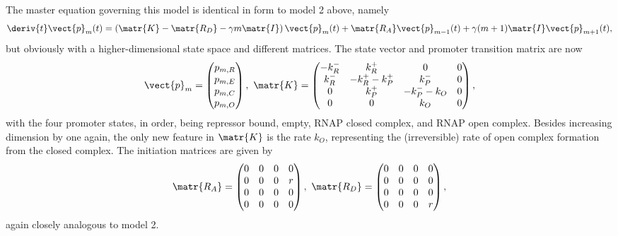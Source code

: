 The master equation governing this model is identical in form to model 2 above,
namely
\begin{equation}
\deriv{t}\vect{p}_m(t) =
\left( \matr{K} - \matr{R_D} - \gamma m \matr{I} \right) \vect{p}_m(t)
                + \matr{R_A} \vect{p}_{m-1}(t) +
                \gamma (m+1) \matr{I} \vect{p}_{m+1}(t),
\end{equation}
but obviously with a higher-dimensional state space and different matrices. The
state vector and promoter transition matrix are now
\begin{equation}
\vect{p}_m = \begin{pmatrix} p_{m,R} \\ p_{m,E} \\
                             p_{m,C} \\ p_{m,O}\end{pmatrix},\
\matr{K} = \begin{pmatrix} -k_R^- & k_R^+ & 0 & 0\\
                        k_R^- & -k_R^+ -k_P^+ & k_P^- & 0 \\
                        0 & k_P^+ & -k_P^- - k_O & 0 \\
                        0 & 0 & k_O & 0
                \end{pmatrix},
\end{equation}
with the four promoter states, in order, being repressor bound, empty, RNAP
closed complex, and RNAP open complex. Besides increasing dimension by one
again, the only new feature in $\matr{K}$ is the rate $k_O$, representing the
(irreversible) rate of open complex formation from the closed complex. The
initiation matrices are given by
\begin{equation}
\matr{R_A} = \begin{pmatrix}
        0 & 0 & 0 & 0 \\ 0 & 0 & 0 & r \\ 0 & 0 & 0 & 0\\ 0 & 0 & 0 & 0
                \end{pmatrix},\
\matr{R_D} = \begin{pmatrix}
        0 & 0 & 0 & 0 \\ 0 & 0 & 0 & 0 \\ 0 & 0 & 0 & 0\\ 0 & 0 & 0 & r
                \end{pmatrix},
\end{equation}
again closely analogous to model 2.

